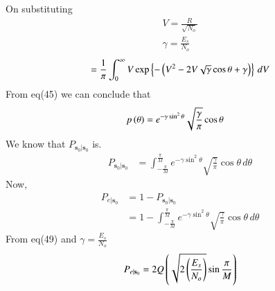 \documentclass[journal,12pt,twocolumn]{IEEEtran}
\begin{document}
\begin{problem}
\begin{enumerate}
On substituting
\begin{align}
V=\frac{R}{\sqrt{N_o}}\\
\gamma={\frac{{E_s}}{N_o}}
\end{align} 
\begin{align}
=\frac{1}{\pi}\int_{0}^{\infty}V\exp\left\{-\left(V^2 - 2V \sqrt{\gamma}\cos \theta +\gamma\right)\right\}\,dV
\end{align}
From eq(45) 
we can conclude that 
\begin{align}
p\left(\theta\right)&=e^{-\gamma\sin^2 \theta} \sqrt{\frac{\gamma}{\pi}}\cos \theta
\end{align} 
We know that $P_{\mathbf{s}_0|\mathbf{s}_0}$ is.
\begin{align}
P_{\mathbf{s}_0|\mathbf{s}_0}&=\int_{ -\frac{\pi}{M}}^{ \frac{\pi}{M}}e^{-\gamma\sin^2 \theta} \sqrt{\frac{\gamma}{\pi}}\cos \theta\,d\theta
\end{align} 
Now,
\begin{align}
P_{e|\mathbf{s}_0}&=1-P_{\mathbf{s}_0|\mathbf{s}_0}\\
&=1-\int_{ -\frac{\pi}{M}}^{ \frac{\pi}{M}}e^{-\gamma\sin^2 \theta} \sqrt{\frac{\gamma}{\pi}}\cos \theta\,d\theta
\end{align} 
From eq(49) and $\gamma={\frac{{E_s}}{N_o}}$
\begin{equation}
P_{e|\mathbf{s}_0}=2Q\left(\sqrt{2\left(\frac{{E_s}}{N_o}\right)}\sin \frac{\pi}{M}\right)
\end{equation}
\end{enumerate}
\end{problem}
%
\end{document}
